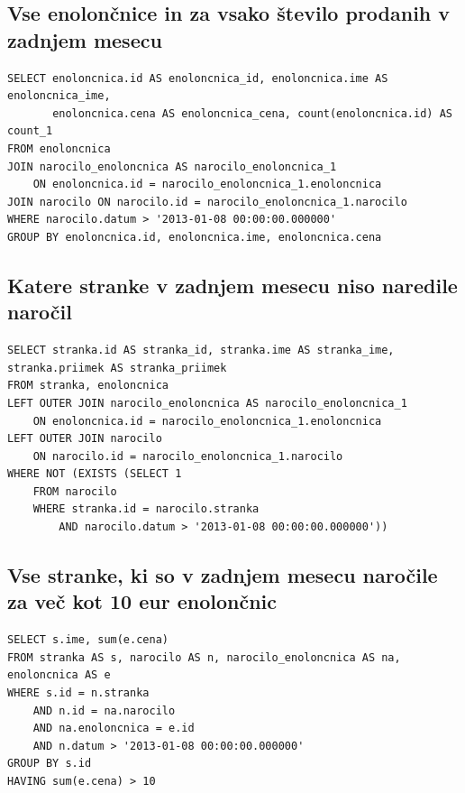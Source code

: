 \documentclass[12pt]{article}
\begin{document}
\subsection{Vse enolončnice in za vsako število prodanih v zadnjem mesecu}

\begin{verbatim}
SELECT enoloncnica.id AS enoloncnica_id, enoloncnica.ime AS enoloncnica_ime,
       enoloncnica.cena AS enoloncnica_cena, count(enoloncnica.id) AS count_1 
FROM enoloncnica
JOIN narocilo_enoloncnica AS narocilo_enoloncnica_1
    ON enoloncnica.id = narocilo_enoloncnica_1.enoloncnica
JOIN narocilo ON narocilo.id = narocilo_enoloncnica_1.narocilo 
WHERE narocilo.datum > '2013-01-08 00:00:00.000000'
GROUP BY enoloncnica.id, enoloncnica.ime, enoloncnica.cena
\end{verbatim}

\subsection{Katere stranke v zadnjem mesecu niso naredile naročil}

\begin{verbatim}
SELECT stranka.id AS stranka_id, stranka.ime AS stranka_ime, stranka.priimek AS stranka_priimek 
FROM stranka, enoloncnica
LEFT OUTER JOIN narocilo_enoloncnica AS narocilo_enoloncnica_1
    ON enoloncnica.id = narocilo_enoloncnica_1.enoloncnica
LEFT OUTER JOIN narocilo
    ON narocilo.id = narocilo_enoloncnica_1.narocilo 
WHERE NOT (EXISTS (SELECT 1 
    FROM narocilo 
    WHERE stranka.id = narocilo.stranka
        AND narocilo.datum > '2013-01-08 00:00:00.000000'))
\end{verbatim}

\subsection{Vse stranke, ki so v zadnjem mesecu naročile za več kot 10 eur enolončnic}

\begin{verbatim}
SELECT s.ime, sum(e.cena)
FROM stranka AS s, narocilo AS n, narocilo_enoloncnica AS na, enoloncnica AS e
WHERE s.id = n.stranka
    AND n.id = na.narocilo
    AND na.enoloncnica = e.id
    AND n.datum > '2013-01-08 00:00:00.000000'
GROUP BY s.id
HAVING sum(e.cena) > 10
\end{verbatim}
    
\end{document}
